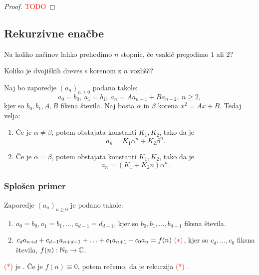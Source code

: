 \begin{proof}
    \textcolor{red}{TODO}
\end{proof}

\newpage
\subsection{Rekurzivne enačbe}
\begin{primer} 
    Na koliko načinov lahko prehodimo $n$ stopnic, če vsakič pregodimo $1$ ali $2$?
\end{primer}

\begin{primer}
    Koliko je dvojiških dreves s korenom z $n$ vozlišč?
\end{primer}

\begin{izrek}
    Naj bo zaporedje $(a_n)_{n \geq 0}$ podano takole:
    $$a_0 = b_0, \ a_1 = b_1, \ a_n = A a_{n-1} + B a_{n-2}, \ n \geq 2,$$
    kjer so $b_0, b_1, A, B$ fiksna števila. 
    Naj bosta $\alpha$ in $\beta$ korena  $x^2 = Ax + B$. Tedaj velja:
    \begin{enumerate}
        \item Če je $\alpha \neq \beta$, potem obstajata konstanti $K_1, K_2$, tako da je 
        $$a_n = K_1 \alpha^n + K_2 \beta^n.$$
        \item Če je $\alpha = \beta$, potem obstajata konstanti $K_1, K_2$, tako da je 
        $$a_n = (K_1 + K_2n) \alpha^n.$$     
    \end{enumerate}
\end{izrek}

\subsubsection*{Splošen primer}
Zaporedje $(a_n)_{n \geq 0}$ je podano takole:
\begin{enumerate}
    \item $a_0 = b_0, a_1 = b_1, \ldots, a_{d-1} = d _{d-1}$, kjer so $b_0, b_1, \ldots, b_{d-1}$ fiksna števila.
    \item $c_da_{n+d} + c_{d-1}a_{n+d-1} + \ldots + c_1 a _{n+1} + c_0 a_n = f(n) \ \textcolor{red}{(*)}$, kjer so $c_d, \ldots, c_0$ fiksna števila, $f(n): \mathbb{N}_0 \to \mathbb{C}$.
\end{enumerate}

\begin{definicija}
    \textcolor{red}{(*)} je . Če je $f(n) \equiv 0$, potem rečemo, da je rekurzija \textcolor{red}{(*)} .
\end{definicija}

